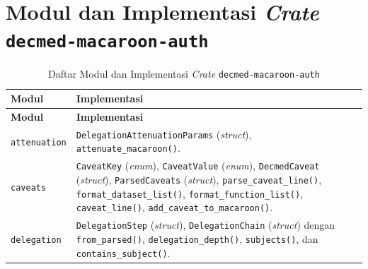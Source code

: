 \chapter{Modul dan Implementasi \textit{Crate} \texttt{decmed-macaroon-auth}}
\label{lampiran:implementasi-crate-decmed-macaroon-auth}

\begingroup
\small
\begin{longtable}{|>{\raggedright\arraybackslash}p{}|>{\raggedright\arraybackslash}p{}|}
	\caption{Daftar Modul dan Implementasi \textit{Crate} \texttt{decmed-macaroon-auth}}
	\label{tab:modul-crate-decmed-macaroon-auth}                                                                                                                                                                                                                                                                                                      \\
	\hline
	\textbf{Modul} & \textbf{Implementasi}                                                                                                                                                                                                                                                                                                            \\
	\hline
	\endfirsthead
	\hline
	\textbf{Modul} & \textbf{Implementasi}                                                                                                                                                                                                                                                                                                            \\
	\hline
	\endhead

	\texttt{attenuation}
	               & \texttt{DelegationAttenuationParams} (\textit{struct}), \texttt{attenuate\_macaroon()}.
	\\ \hline

	\texttt{caveats}
	               & \texttt{CaveatKey} (\textit{enum}), \texttt{CaveatValue} (\textit{enum}), \texttt{DecmedCaveat} (\textit{struct}), \texttt{ParsedCaveats} (\textit{struct}), \texttt{parse\_caveat\_line()}, \texttt{format\_dataset\_list()}, \texttt{format\_function\_list()}, \texttt{caveat\_line()}, \texttt{add\_caveat\_to\_macaroon()}.
	\\ \hline

	\texttt{delegation}
	               & \texttt{DelegationStep} (\textit{struct}), \texttt{DelegationChain} (\textit{struct}) dengan \texttt{from\_parsed()}, \texttt{delegation\_depth()}, \texttt{subjects()}, dan \texttt{contains\_subject()}.
	\\ \hline


\end{longtable}
